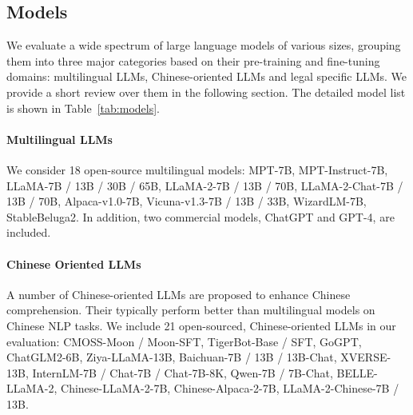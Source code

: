 \subsection{Models}
We evaluate a wide spectrum of large language models of various sizes, grouping them into three major categories based on their pre-training and fine-tuning domains: multilingual LLMs, Chinese-oriented LLMs and legal specific LLMs. We provide a short review over them in the following section. The detailed model list is shown in Table~\ref{tab:models}.

\paragraph{Multilingual LLMs} We consider 18 open-source multilingual models: MPT-7B, MPT-Instruct-7B, LLaMA-7B / 13B / 30B / 65B, LLaMA-2-7B / 13B / 70B, LLaMA-2-Chat-7B / 13B / 70B, Alpaca-v1.0-7B, Vicuna-v1.3-7B / 13B / 33B, WizardLM-7B, StableBeluga2. In addition, two commercial models, ChatGPT and GPT-4, are included.

\paragraph{Chinese Oriented LLMs} A number of Chinese-oriented LLMs are proposed to enhance Chinese comprehension. Their typically perform better than multilingual models on Chinese NLP tasks. We include 21 open-sourced, Chinese-oriented LLMs in our evaluation: CMOSS-Moon / Moon-SFT, TigerBot-Base / SFT, GoGPT, ChatGLM2-6B, Ziya-LLaMA-13B, Baichuan-7B / 13B / 13B-Chat, XVERSE-13B, InternLM-7B / Chat-7B / Chat-7B-8K, Qwen-7B / 7B-Chat, BELLE-LLaMA-2, Chinese-LLaMA-2-7B, Chinese-Alpaca-2-7B, LLaMA-2-Chinese-7B / 13B.


